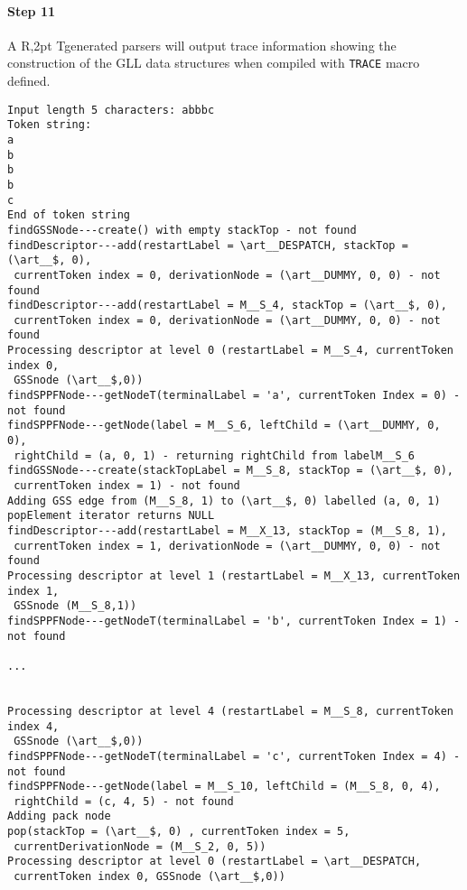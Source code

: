 \documentclass[11pt]{article}
\newenvironment{codebox}{\par\noindent\scriptsize\begin{boxedminipage}[t]{\textwidth}\vspace*{1ex}\par}{\end{boxedminipage}\par\vspace*{1ex}\par\noindent}
\newcommand{\art}{{\rm A\kern -2pt R\kern -2,2pt T}}
\begin{document}
\paragraph{Step 11} 
\art generated parsers will output trace information
showing the construction of the GLL data structures when compiled with
{\tt TRACE} macro defined.

\begin{codebox}
\begin{verbatim}
Input length 5 characters: abbbc
Token string:
a
b
b
b
c
End of token string
findGSSNode---create() with empty stackTop - not found
findDescriptor---add(restartLabel = \art__DESPATCH, stackTop = (\art__$, 0),
 currentToken index = 0, derivationNode = (\art__DUMMY, 0, 0) - not found
findDescriptor---add(restartLabel = M__S_4, stackTop = (\art__$, 0),
 currentToken index = 0, derivationNode = (\art__DUMMY, 0, 0) - not found
Processing descriptor at level 0 (restartLabel = M__S_4, currentToken index 0,
 GSSnode (\art__$,0))
findSPPFNode---getNodeT(terminalLabel = 'a', currentToken Index = 0) - not found
findSPPFNode---getNode(label = M__S_6, leftChild = (\art__DUMMY, 0, 0),
 rightChild = (a, 0, 1) - returning rightChild from labelM__S_6
findGSSNode---create(stackTopLabel = M__S_8, stackTop = (\art__$, 0),
 currentToken index = 1) - not found
Adding GSS edge from (M__S_8, 1) to (\art__$, 0) labelled (a, 0, 1)
popElement iterator returns NULL
findDescriptor---add(restartLabel = M__X_13, stackTop = (M__S_8, 1),
 currentToken index = 1, derivationNode = (\art__DUMMY, 0, 0) - not found
Processing descriptor at level 1 (restartLabel = M__X_13, currentToken index 1,
 GSSnode (M__S_8,1))
findSPPFNode---getNodeT(terminalLabel = 'b', currentToken Index = 1) - not found

...


Processing descriptor at level 4 (restartLabel = M__S_8, currentToken index 4,
 GSSnode (\art__$,0))
findSPPFNode---getNodeT(terminalLabel = 'c', currentToken Index = 4) - not found
findSPPFNode---getNode(label = M__S_10, leftChild = (M__S_8, 0, 4),
 rightChild = (c, 4, 5) - not found
Adding pack node
pop(stackTop = (\art__$, 0) , currentToken index = 5,
 currentDerivationNode = (M__S_2, 0, 5))
Processing descriptor at level 0 (restartLabel = \art__DESPATCH,
 currentToken index 0, GSSnode (\art__$,0))
\end{verbatim}
\end{codebox}
\end{document}
